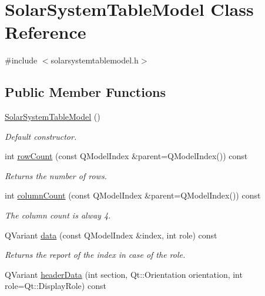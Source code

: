 \hypertarget{classSolarSystemTableModel}{
\section{\-Solar\-System\-Table\-Model \-Class \-Reference}
\label{dc/d37/classSolarSystemTableModel}
}


{\ttfamily \#include $<$solarsystemtablemodel.\-h$>$}

\subsection*{\-Public \-Member \-Functions}
\begin{DoxyCompactItemize}
\item 
\hyperlink{classSolarSystemTableModel_a5157f0d683d312f7861ce3167780f1ed}{\-Solar\-System\-Table\-Model} ()
\begin{DoxyCompactList}\small\item\em \-Default constructor. \end{DoxyCompactList}\item 
int \hyperlink{classSolarSystemTableModel_a72917602c0d7fc4d59efec3dc5c34121}{row\-Count} (const \-Q\-Model\-Index \&parent=\-Q\-Model\-Index()) const 
\begin{DoxyCompactList}\small\item\em \-Returns the number of rows. \end{DoxyCompactList}\item 
int \hyperlink{classSolarSystemTableModel_a9b5c7dcbada0ef855863fef50733de98}{column\-Count} (const \-Q\-Model\-Index \&parent=\-Q\-Model\-Index()) const 
\begin{DoxyCompactList}\small\item\em \-The column count is alway 4. \end{DoxyCompactList}\item 
\-Q\-Variant \hyperlink{classSolarSystemTableModel_a6e706c80d315c4e57519dea4ac6bbeea}{data} (const \-Q\-Model\-Index \&index, int role) const 
\begin{DoxyCompactList}\small\item\em \-Returns the report of the index in case of the role. \end{DoxyCompactList}\item 
\-Q\-Variant \hyperlink{classSolarSystemTableModel_ab6f41e0affc9a36a3bdfa41bc6e91a79}{header\-Data} (int section, \-Qt\-::\-Orientation orientation, int role=\-Qt\-::\-Display\-Role) const 

\end{DoxyCompactItemize}
